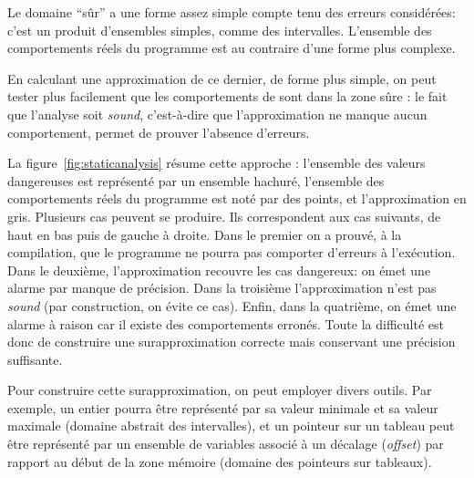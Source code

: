 Le domaine \enquote{sûr} a une forme assez simple compte tenu des erreurs
considérées: c'est un produit d'ensembles simples, comme des intervalles.
L'ensemble des comportements réels du programme est au contraire d'une forme
plus complexe.

En calculant une approximation de ce dernier, de forme plus simple, on peut
tester plus facilement que les comportements de sont dans la zone sûre : le fait
que l'analyse soit \emph{sound}, c'est-à-dire que l'approximation ne manque
aucun comportement, permet de prouver l'absence d'erreurs.

La figure~\ref{fig:staticanalysis} résume cette approche : l'ensemble des
valeurs dangereuses est représenté par un ensemble hachuré, l'ensemble des
comportements réels du programme est noté par des points, et l'approximation en
gris. Plusieurs cas peuvent se produire. Ils correspondent aux cas suivants, de
haut en bas puis de gauche à droite. Dans le premier on a prouvé, à la
compilation, que le programme ne pourra pas comporter d'erreurs à l'exécution.
Dans le deuxième, l'approximation recouvre les cas dangereux: on émet une alarme
par manque de précision. Dans la troisième l'approximation n'est pas
\emph{sound} (par construction, on évite ce cas). Enfin, dans la quatrième, on
émet une alarme à raison car il existe des comportements erronés. Toute la
difficulté est donc de construire une surapproximation correcte mais conservant
une précision suffisante.

Pour construire cette surapproximation, on peut employer divers outils. Par
exemple, un entier pourra être représenté par sa valeur minimale et sa valeur
maximale (domaine abstrait des intervalles), et un pointeur sur un tableau peut
être représenté par un ensemble de variables associé à un décalage
(\emph{offset}) par rapport au début de la zone mémoire (domaine des pointeurs
sur tableaux).




